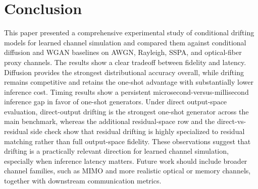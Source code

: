 \documentclass[conference]{IEEEtran}
\begin{document}


\section{Conclusion}
This paper presented a comprehensive experimental study of conditional drifting models for learned channel simulation and compared them against conditional diffusion and WGAN baselines on AWGN, Rayleigh, SSPA, and optical-fiber proxy channels. The results show a clear tradeoff between fidelity and latency. Diffusion provides the strongest distributional accuracy overall, while drifting remains competitive and retains the one-shot advantage with substantially lower inference cost. Timing results show a persistent microsecond-versus-millisecond inference gap in favor of one-shot generators. Under direct output-space evaluation, direct-output drifting is the strongest one-shot generator across the main benchmark, whereas the additional residual-space row and the direct-vs-residual side check show that residual drifting is highly specialized to residual matching rather than full output-space fidelity. These observations suggest that drifting is a practically relevant direction for learned channel simulation, especially when inference latency matters. Future work should include broader channel families, such as MIMO and more realistic optical or memory channels, together with downstream communication metrics.


\end{document}
